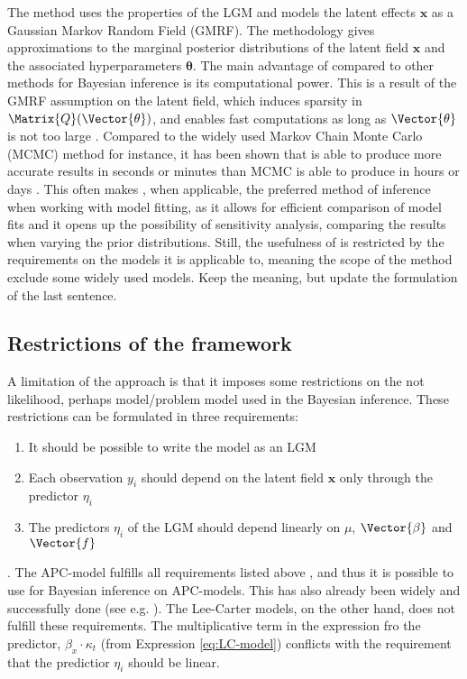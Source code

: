 \newpar The \inla method uses the properties of the LGM and models the latent effects $\mathbf{x}$ as a Gaussian Markov Random Field (GMRF). The methodology gives approximations to the marginal posterior distributions of the latent field $\mathbf{x}$ and the associated hyperparameters $\boldsymbol{\theta}$. The main advantage of \inla compared to other methods for Bayesian inference is its computational power. This is a result of the GMRF assumption on the latent field, which induces sparsity in $\Matrix{Q}(\Vector{\theta})$, and enables fast computations as long as $\Vector{\theta}$ is not too large \parencite{martinoRiebler2019}. Compared to the widely used Markov Chain Monte Carlo (MCMC) method for instance, it has been shown that \inla is able to produce more accurate results in seconds or minutes than MCMC is able to produce in hours or days \parencite{rue2009inla}.
This often makes \inla, when applicable, the preferred method of inference when working with model fitting, as it allows for efficient comparison of model fits and it opens up the possibility of sensitivity analysis, comparing the results when varying the prior distributions. Still, the usefulness of \inla is restricted by the requirements on the models it is applicable to, meaning the scope of the \inla method exclude some widely used models. \textcolor{myDarkGreen}{Keep the meaning, but update the formulation of the last sentence. }

\subsection{Restrictions of the \inla framework}
\label{sec:InlaRestrictions}
A limitation of the \inla approach is that it imposes some restrictions on the \textcolor{myDarkGreen}{not likelihood, perhaps model/problem} model used in the Bayesian inference. These restrictions can be formulated in three requirements:
\begin{enumerate}
    \item It should be possible to write the model as an LGM
    \item Each observation $y_i$ should depend on the latent field $\textbf{x}$ only through the predictor $\eta_i$ 
    \item The predictors $\eta_i$ of the LGM should depend linearly on $\mu$, $\Vector{\beta}$ and $\Vector{f}$
    \label{item:inlaRequirements}
\end{enumerate}
\parencite{martinoRiebler2019}.
\newpar The APC-model fulfills all requirements listed above \parencite{rieblerHeld2010}, and thus it is possible to use \inla for Bayesian inference on APC-models. This has also already been widely and successfully done (see e.g. \textcite{RieblerThesis2010}). The Lee-Carter models, on the other hand, does not fulfill these requirements. The multiplicative term in the expression fro the predictor, $\beta_x\cdot \kappa_t$ (from Expression \ref{eq:LC-model}) conflicts with the requirement that the predictior $\eta_i$ should be linear.  
   
